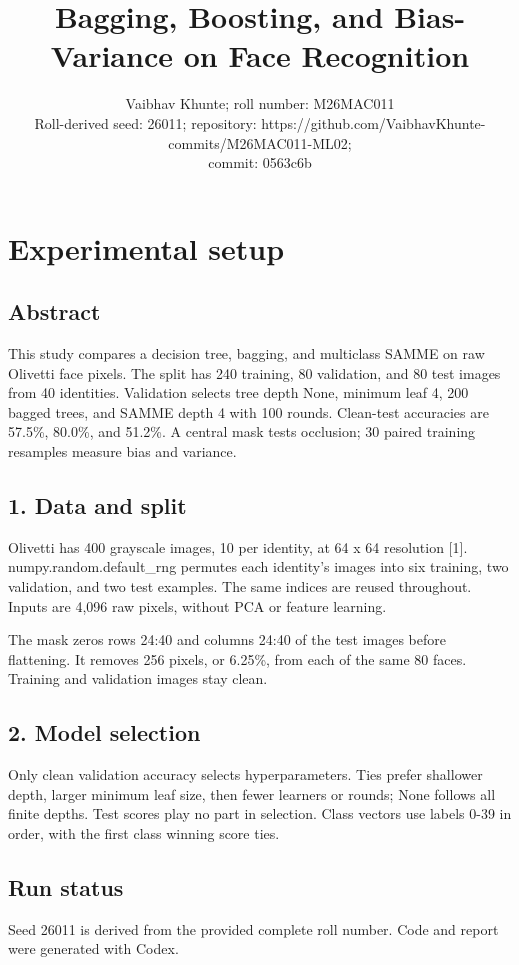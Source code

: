 \documentclass[10pt,twocolumn,letterpaper]{article}
\title{Bagging, Boosting, and Bias-Variance on Face Recognition}
\author{Vaibhav Khunte; roll number: M26MAC011\\Roll-derived seed: 26011; repository: https://github.com/VaibhavKhunte-commits/M26MAC011-ML02; \\ commit: 0563c6b}
\begin{document}
\maketitle
\section*{Experimental setup}
\subsection*{Abstract}
This study compares a decision tree, bagging, and multiclass SAMME on raw Olivetti face pixels. The split has 240 training, 80 validation, and 80 test images from 40 identities. Validation selects tree depth None, minimum leaf 4, 200 bagged trees, and SAMME depth 4 with 100 rounds. Clean-test accuracies are 57.5\%, 80.0\%, and 51.2\%. A central mask tests occlusion; 30 paired training resamples measure bias and variance.

\subsection*{1. Data and split}
Olivetti has 400 grayscale images, 10 per identity, at 64 x 64 resolution [1]. numpy.random.default\_rng permutes each identity's images into six training, two validation, and two test examples. The same indices are reused throughout. Inputs are 4,096 raw pixels, without PCA or feature learning.

The mask zeros rows 24:40 and columns 24:40 of the test images before flattening. It removes 256 pixels, or 6.25\%, from each of the same 80 faces. Training and validation images stay clean.

\subsection*{2. Model selection}
Only clean validation accuracy selects hyperparameters. Ties prefer shallower depth, larger minimum leaf size, then fewer learners or rounds; None follows all finite depths. Test scores play no part in selection. Class vectors use labels 0-39 in order, with the first class winning score ties.

\newpage
\subsection*{Run status}
Seed 26011 is derived from the provided complete roll number. Code and report were generated with Codex.
\end{document}
